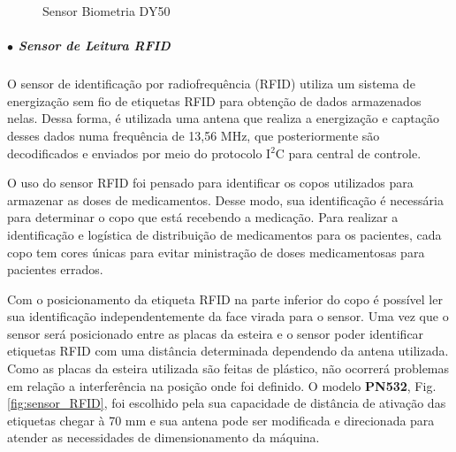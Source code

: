     \begin{figure}[H]
        \centering
        \hspace{0.1\textwidth}
        \caption{Sensor Biometria DY50}\label{fig:sensor_biometria}
    \end{figure}
    
    \subparagraph*{$\bullet$ Sensor de Leitura RFID} \hfill
    
    O sensor de identificação por radiofrequência (RFID) utiliza um sistema de energização sem fio de etiquetas RFID para obtenção de dados armazenados nelas. Dessa forma, é utilizada uma antena que realiza a energização e captação desses dados numa frequência de 13,56 MHz, que posteriormente são decodificados e enviados por meio do protocolo I$^2$C para central de controle. 
    
    O uso do sensor RFID foi pensado para identificar os copos utilizados para armazenar as doses de medicamentos. Desse modo, sua identificação é necessária para determinar o copo que está recebendo a medicação. Para realizar a identificação e logística de distribuição de medicamentos para os pacientes, cada copo tem cores únicas para evitar ministração de doses medicamentosas para pacientes errados. 
    
    Com o posicionamento da etiqueta RFID na parte inferior do copo é possível ler sua identificação independentemente da face virada para o sensor. Uma vez que o sensor será posicionado entre as placas da esteira e o sensor poder identificar etiquetas RFID com uma distância determinada dependendo da antena utilizada. Como as placas da esteira utilizada são feitas de plástico, não ocorrerá problemas em relação a interferência na posição onde foi definido. 
    O modelo \textbf{PN532}, Fig. \ref{fig:sensor_RFID}, foi escolhido pela sua capacidade de distância de ativação das etiquetas chegar à 70 mm e sua antena pode ser modificada e direcionada para atender as necessidades de dimensionamento da máquina.
    
